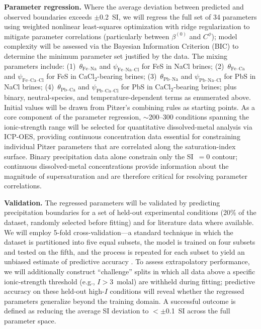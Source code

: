 \documentclass[12pt]{article}
\begin{document}
\textbf{Parameter regression.} Where the average deviation between predicted and observed boundaries exceeds $\pm$0.2~SI, we will regress the full set of 34 parameters using weighted nonlinear least-squares optimization with ridge regularization to mitigate parameter correlations (particularly between $\beta^{(0)}$ and $C^\phi$); model complexity will be assessed via the Bayesian Information Criterion (BIC) to determine the minimum parameter set justified by the data. The mixing parameters include: (1)~$\theta_{\text{Fe--Na}}$ and $\psi_{\text{Fe--Na--Cl}}$ for FeS in NaCl brines; (2)~$\theta_{\text{Fe--Ca}}$ and $\psi_{\text{Fe--Ca--Cl}}$ for FeS in CaCl$_2$-bearing brines; (3)~$\theta_{\text{Pb--Na}}$ and $\psi_{\text{Pb--Na--Cl}}$ for PbS in NaCl brines; (4)~$\theta_{\text{Pb--Ca}}$ and $\psi_{\text{Pb--Ca--Cl}}$ for PbS in CaCl$_2$-bearing brines; plus binary, neutral-species, and temperature-dependent terms as enumerated above. Initial values will be drawn from Pitzer's combining rules as starting points. As a core component of the parameter regression, $\sim$200--300 conditions spanning the ionic-strength range will be selected for quantitative dissolved-metal analysis via ICP-OES, providing continuous concentration data essential for constraining individual Pitzer parameters that are correlated along the saturation-index surface. Binary precipitation data alone constrain only the SI~$= 0$ contour; continuous dissolved-metal concentrations provide information about the magnitude of supersaturation and are therefore critical for resolving parameter correlations.

\textbf{Validation.} The regressed parameters will be validated by predicting precipitation boundaries for a set of held-out experimental conditions (20\% of the dataset, randomly selected before fitting) and for literature data where available. We will employ 5-fold cross-validation---a standard technique in which the dataset is partitioned into five equal subsets, the model is trained on four subsets and tested on the fifth, and the process is repeated for each subset to yield an unbiased estimate of predictive accuracy \cite{arlot2010}. To assess extrapolatory performance, we will additionally construct ``challenge'' splits in which all data above a specific ionic-strength threshold (e.g., $I > 3$~molal) are withheld during fitting; predictive accuracy on these held-out high-$I$ conditions will reveal whether the regressed parameters generalize beyond the training domain. A successful outcome is defined as reducing the average SI deviation to $< \pm$0.1~SI across the full parameter space.
\end{document}
